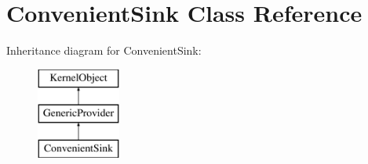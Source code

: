 \hypertarget{class_convenient_sink}{}\section{Convenient\+Sink Class Reference}
\label{class_convenient_sink}
Inheritance diagram for Convenient\+Sink\+:\begin{figure}[H]
\begin{center}
\leavevmode
\includegraphics[height=3.000000cm]{class_convenient_sink}
\end{center}
\end{figure}
